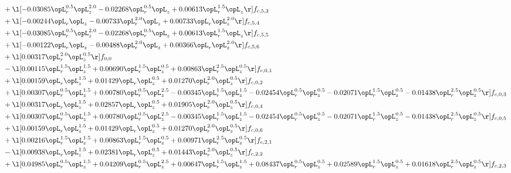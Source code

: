 \begin{alignat}{2}
& + \l[  -0.03085 \opL_r^{0.5} \opL_z^{2.0}   -0.02268 \opL_r^{0.5} \opL_z +  0.00613 \opL_r^{1.5} \opL_z  \r] f_{c,5,3} \nonumber \\ 
& + \l[  -0.00244 \opL_r \opL_z   -0.00733 \opL_r^{2.0} \opL_z +  0.00733 \opL_r \opL_z^{2.0}  \r] f_{c,5,4} \nonumber \\ 
& + \l[  -0.03085 \opL_r^{0.5} \opL_z^{2.0}   -0.02268 \opL_r^{0.5} \opL_z +  0.00613 \opL_r^{1.5} \opL_z  \r] f_{c,5,5} \nonumber \\ 
& + \l[  -0.00122 \opL_r \opL_z   -0.00488 \opL_r^{2.0} \opL_z +  0.00366 \opL_r \opL_z^{2.0}  \r] f_{c,5,6} \nonumber \\ 
& + \l[  0.00317 \opL_r^{2.0} \opL_z^{0.5}  \r] f_{0,0} \nonumber \\ 
& - \l[  0.00115 \opL_r^{1.5} \opL_z^{1.5} +  0.00690 \opL_r^{1.5} \opL_z^{0.5} +  0.00863 \opL_r^{2.5} \opL_z^{0.5}  \r] f_{c,0,1} \nonumber \\ 
& + \l[  0.00159 \opL_r \opL_z^{1.5} +  0.01429 \opL_r \opL_z^{0.5} +  0.01270 \opL_r^{2.0} \opL_z^{0.5}  \r] f_{c,0,2} \nonumber \\ 
& + \l[  0.00307 \opL_r^{0.5} \opL_z^{1.5} +  0.00780 \opL_r^{0.5} \opL_z^{2.5}   -0.00345 \opL_r^{1.5} \opL_z^{1.5}   -0.02454 \opL_r^{0.5} \opL_z^{0.5}   -0.02071 \opL_r^{1.5} \opL_z^{0.5}   -0.01438 \opL_r^{2.5} \opL_z^{0.5}  \r] f_{c,0,3} \nonumber \\ 
& + \l[  0.00317 \opL_r \opL_z^{1.5} +  0.02857 \opL_r \opL_z^{0.5} +  0.01905 \opL_r^{2.0} \opL_z^{0.5}  \r] f_{c,0,4} \nonumber \\ 
& + \l[  0.00307 \opL_r^{0.5} \opL_z^{1.5} +  0.00780 \opL_r^{0.5} \opL_z^{2.5}   -0.00345 \opL_r^{1.5} \opL_z^{1.5}   -0.02454 \opL_r^{0.5} \opL_z^{0.5}   -0.02071 \opL_r^{1.5} \opL_z^{0.5}   -0.01438 \opL_r^{2.5} \opL_z^{0.5}  \r] f_{c,0,5} \nonumber \\ 
& + \l[  0.00159 \opL_r \opL_z^{1.5} +  0.01429 \opL_r \opL_z^{0.5} +  0.01270 \opL_r^{2.0} \opL_z^{0.5}  \r] f_{c,0,6} \nonumber \\ 
& + \l[  0.00216 \opL_r^{1.5} \opL_z^{1.5} +  0.00863 \opL_r^{1.5} \opL_z^{0.5} +  0.00971 \opL_r^{2.5} \opL_z^{0.5}  \r] f_{c,2,1} \nonumber \\ 
& - \l[  0.00938 \opL_r \opL_z^{1.5} +  0.02381 \opL_r \opL_z^{0.5} +  0.01443 \opL_r^{2.0} \opL_z^{0.5}  \r] f_{c,2,2} \nonumber \\ 
& + \l[  0.04985 \opL_r^{0.5} \opL_z^{1.5} +  0.04209 \opL_r^{0.5} \opL_z^{2.5} +  0.00647 \opL_r^{1.5} \opL_z^{1.5} +  0.08437 \opL_r^{0.5} \opL_z^{0.5} +  0.02589 \opL_r^{1.5} \opL_z^{0.5} +  0.01618 \opL_r^{2.5} \opL_z^{0.5}  \r] f_{c,2,3} \nonumber \\ 

\end{alignat}
